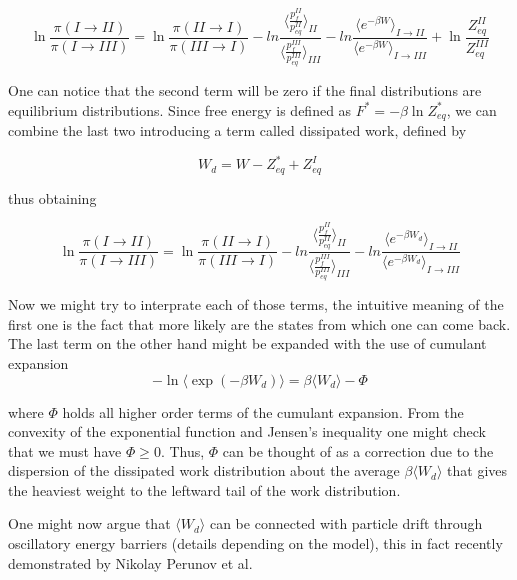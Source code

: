 \documentclass[a4paper,12pt]{article}
\begin{document}
\begin{equation}
  \ln \frac{\pi(I \to II)}{\pi(I \to III)} =
  \ln \frac{\pi(II \to I)}{\pi(III \to I)} - ln \frac{ \langle \frac{p_{f}^{II}}{p_{eq}^{II}}  \rangle_{II}}{ \langle \frac{p_{f}^{III}}{p_{eq}^{III}}  \rangle_{III} }
  -ln \frac{\langle e^{ - \beta W} \rangle_{I \to II}}{\langle e^{ - \beta W} \rangle_{I \to III}} + \ln{\frac{Z_{eq}^{II}}{Z_{eq}^{III} }}
\end{equation}

One can notice that the second term will be zero if the final distributions are equilibrium distributions. Since free energy is defined as $F^* = -\beta \ln Z_{eq}^*$, we can combine the last two introducing a term called dissipated work, defined by

\begin{equation}
  W_d =W - Z_{eq}^* + Z_{eq}^I
\end{equation}

thus obtaining

\begin{equation}
  \ln \frac{\pi(I \to II)}{\pi(I \to III)} =
  \ln \frac{\pi(II \to I)}{\pi(III \to I)} - ln \frac{ \langle \frac{p_{f}^{II}}{p_{eq}^{II}}  \rangle_{II}}{ \langle \frac{p_{f}^{III}}{p_{eq}^{III}}  \rangle_{III} }
  -ln \frac{\langle e^{ - \beta W_d} \rangle_{I \to II}}{\langle e^{ - \beta W_d} \rangle_{I \to III}} 
\end{equation}

Now we might try to interprate each of those terms, the intuitive meaning of the first one is the fact that more likely are the states from which one can come back. The last term on the other hand might be expanded with the use of cumulant expansion
\begin{equation}
  -\ln \langle \exp(-\beta W_d)\rangle= \beta \langle W_d \rangle - \Phi
\end{equation}

where $\Phi$ holds all higher order terms of the cumulant expansion. From the convexity of the exponential function and Jensen's inequality one might check that we must have $\Phi \geq 0$. Thus, $\Phi$ can be thought of as a correction due to the dispersion of the dissipated work distribution about the average $\beta \langle W_d \rangle $ that gives the heaviest weight to the leftward tail of the work distribution.\cite{Jarzynski:2006cq}

One might now argue that $\langle W_d \rangle $ can be connected with particle drift through oscillatory energy barriers (details depending on the model), this in fact recently demonstrated by Nikolay Perunov et al\cite{Perunov:2016hl}.
\end{document}
